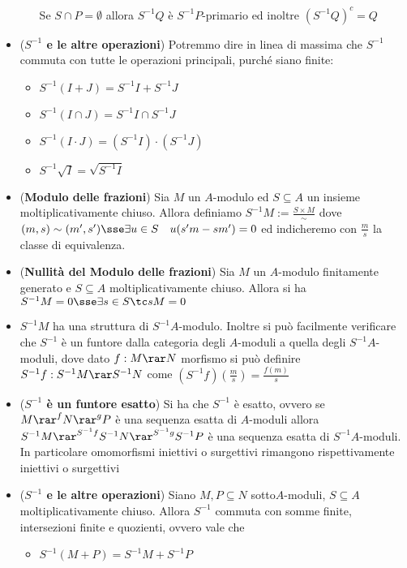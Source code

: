 \documentclass[a4paper,NoNotes,GeneralMath]{stdmdoc}
\begin{document}
\begin{itemize}
\begin{itemize}
					Se $S \cap P = \emptyset$ allora $S^{-1}Q$ è $S^{-1}P$-primario ed inoltre $(S^{-1}Q)^c = Q$
			\end{itemize}
		\item ({\bf $S^{-1}$ e le altre operazioni}) Potremmo dire in linea di massima che $S^{-1}$ commuta con tutte le operazioni principali, purché siano finite:
			\begin{itemize}
				\item $S^{-1}(I + J) = S^{-1}I + S^{-1}J$
				\item $S^{-1}(I \cap J) = S^{-1}I \cap S^{-1}J$
				\item $S^{-1}(I \cdot J) = (S^{-1}I) \cdot (S^{-1}J)$
				\item $S^{-1}\sqrt{I} = \sqrt{S^{-1}I}$
			\end{itemize}
		\item ({\bf Modulo delle frazioni}) Sia $M$ un $A$-modulo ed $S \subseteq A$ un insieme moltiplicativamente chiuso. Allora definiamo $S^{-1}M := \frac{S \times M}{\sim}$ dove $(m, s) \sim (m', s') \sse \exists u \in S \quad u (s'm - sm') = 0$ ed indicheremo con $\frac{m}{s}$ la classe di equivalenza. \\
		\item ({\bf Nullità del Modulo delle frazioni}) Sia $M$ un $A$-modulo finitamente generato e $S \subseteq A$ moltiplicativamente chiuso. Allora si ha $S^{-1}M = 0 \sse \exists s \in S \tc sM = 0$
		\item $S^{-1}M$ ha una struttura di $S^{-1}A$-modulo. Inoltre si può facilmente verificare che $S^{-1}$ è un funtore dalla categoria degli $A$-moduli a quella degli $S^{-1}A$-moduli, dove dato $f: M \rar N$ morfismo si può definire $S^{-1}f: S^{-1}M \rar S^{-1}N$ come $(S^{-1}f) (\frac{m}{s}) = \frac{f(m)}{s}$
		\item ({\bf $S^{-1}$ è un funtore esatto}) Si ha che $S^{-1}$ è esatto, ovvero se $M \rar^f N \rar^g P$ è una sequenza esatta di $A$-moduli allora $S^{-1}M \rar^{S^{-1}f} S^{-1}N \rar^{S^{-1}g} S^{-1}P$ è una sequenza esatta di $S^{-1}A$-moduli. \\
		In particolare omomorfismi iniettivi o surgettivi rimangono rispettivamente iniettivi o surgettivi
		\item ({\bf $S^{-1}$ e le altre operazioni}) Siano $M, P \subseteq N$ sotto$A$-moduli, $S \subseteq A$ moltiplicativamente chiuso. Allora $S^{-1}$ commuta con somme finite, intersezioni finite e quozienti, ovvero vale che
			\begin{itemize}
				\item $S^{-1}(M + P) = S^{-1}M + S^{-1}P$

\end{itemize}
\end{itemize}
\end{document}
